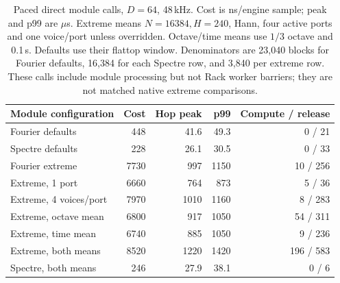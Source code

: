 \begin{table}[htbp]
\centering\small
\begin{tabular}{@{}lrrrr@{}}
\toprule
Module configuration & Cost & Hop peak & p99 & Compute / release \\
\midrule
Fourier defaults & 448 & 41.6 & 49.3 & 0 / 21 \\
Spectre defaults & 228 & 26.1 & 30.5 & 0 / 33 \\
Fourier extreme & 7730 & 997 & 1150 & 10 / 256 \\
Extreme, 1 port & 6660 & 764 & 873 & 5 / 36 \\
Extreme, 4 voices/port & 7970 & 1010 & 1160 & 8 / 283 \\
Extreme, octave mean & 6800 & 917 & 1050 & 54 / 311 \\
Extreme, time mean & 6740 & 885 & 1050 & 9 / 236 \\
Extreme, both means & 8520 & 1220 & 1420 & 196 / 583 \\
Spectre, both means & 246 & 27.9 & 38.1 & 0 / 6 \\
\bottomrule
\end{tabular}
\caption{Paced direct module calls, $D=64$, 48\,kHz. Cost is ns/engine sample; peak and p99 are $\mu$s. Extreme means $N=16384,H=240$, Hann, four active ports and one voice/port unless overridden. Octave/time means use $1/3$ octave and 0.1\,s. Defaults use their flattop window. Denominators are 23,040 blocks for Fourier defaults, 16,384 for each Spectre row, and 3,840 per extreme row. These calls include module processing but not Rack worker barriers; they are not matched native extreme comparisons.}
\label{tab:study-modules}
\end{table}
